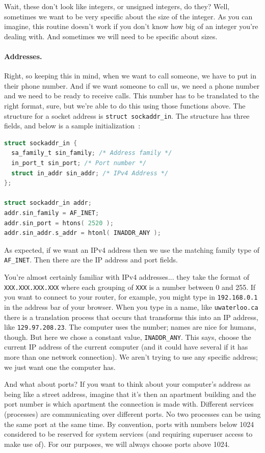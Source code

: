 Wait, these don't look like integers, or unsigned integers, do they? Well, sometimes we want to be very specific about the size of the integer. As you can imagine, this routine doesn't work if you don't know how big of an integer you're dealing with. And sometimes we will need to be specific about sizes.

\paragraph{Addresses.} Right, so keeping this in mind, when we want to call someone, we have to put in their phone number. And if we want someone to call us, we need a phone number and we need to be ready to receive calls. This number has to be translated to the right format, sure, but we're able to do this using those functions above. The structure for a socket address is \texttt{struct sockaddr\_in}. The structure has three fields, and below is a sample initialization~\cite{apunix}:

\begin{lstlisting}[language=C]
struct sockaddr_in {
  sa_family_t sin_family; /* Address family */
  in_port_t sin_port; /* Port number */
  struct in_addr sin_addr; /* IPv4 Address */
};

struct sockaddr_in addr;
addr.sin_family = AF_INET;
addr.sin_port = htons( 2520 );
addr.sin_addr.s_addr = htonl( INADDR_ANY );
\end{lstlisting}

As expected, if we want an IPv4 address then we use the matching family type of \texttt{AF\_INET}. Then there are the IP address and port fields. 

You're almost certainly familiar with IPv4 addresses... they take the format of \texttt{XXX.XXX.XXX.XXX} where each grouping of \texttt{XXX} is a number between 0 and 255. If you want to connect to your router, for example, you might type in \texttt{192.168.0.1} in the address bar of your browser. When you type in a name, like \texttt{uwaterloo.ca} there is a translation process that occurs that transforms this into an IP address, like \texttt{129.97.208.23}. The computer uses the number; names are nice for humans, though. But here we chose a constant value, \texttt{INADDR\_ANY}. This says, choose the current IP address of the current computer (and it could have several if it has more than one network connection). We aren't trying to use any specific address; we just want one the computer has.

And what about ports? If you want to think about your computer's address as being like a street address, imagine that it's then an apartment building and the port number is which apartment the connection is made with. Different services (processes) are communicating over different ports. No two processes can be using the same port at the same time. By convention, ports with numbers below 1024 considered to be reserved for system services (and requiring superuser access to make use of). For our purposes, we will always choose ports above 1024. 

